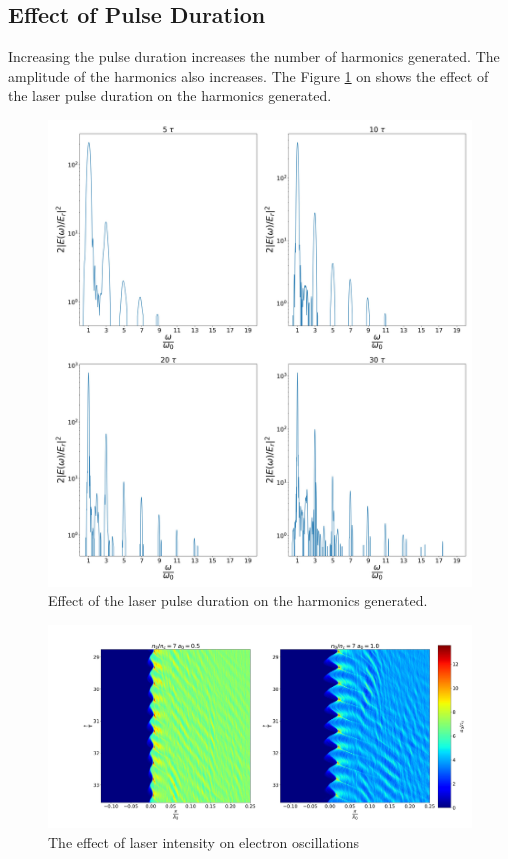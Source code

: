\documentclass[12pt]{article}
\newenvironment{changemargin}[2]{%
\begin{list}{}{%
\setlength{\topsep}{0pt}%
\setlength{\leftmargin}{#1}%
\setlength{\rightmargin}{#2}%
\setlength{\listparindent}{\parindent}%
\setlength{\itemindent}{\parindent}%
\setlength{\parsep}{\parskip}%
}%
\item[]}{\end{list}}
\begin{document}
\begin{changemargin}{-2cm}{-2cm}
    \subsection{Effect of Pulse Duration}
    Increasing the pulse duration increases the number of harmonics generated. The amplitude of the harmonics also increases. The Figure \ref{fig:pulse} on shows the effect of the laser pulse duration on the harmonics generated.
    \begin{figure}[t]
        \centering
        \includegraphics[width=1.0\textwidth, height=0.8\textwidth]{images/pulse.jpg}
        \caption{Effect of the laser pulse duration on the harmonics generated.}
        \label{fig:pulse}
    \end{figure}
    \begin{figure}[t]
        \centering
        \includegraphics[width=1.0\textwidth, height=0.7\textwidth]{images/oscillation1.jpg}
        \caption{The effect of laser intensity on electron oscillations}
        \label{fig:oscillation1}
    \end{figure}

\end{changemargin}
\end{document}
